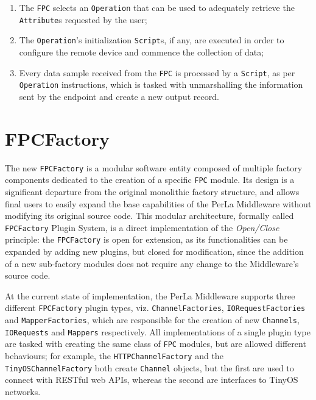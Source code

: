 \begin{enumerate}

    \item The \texttt{FPC} selects an \texttt{Operation} that can be used to
        adequately retrieve the \texttt{Attribute}s requested by the user;

    \item The \texttt{Operation}'s initialization \texttt{Script}s, if any, are
        executed in order to configure the remote device and commence the
        collection of data;

    \item Every data sample received from the \texttt{FPC} is processed by a
        \texttt{Script}, as per \texttt{Operation} instructions, which is
        tasked with unmarshalling the information sent by the endpoint and
        create a new output record.

\end{enumerate}

\section{FPCFactory}
\label{sec:newmiddleware.factory}

The new \texttt{FPCFactory} is a modular software entity composed of multiple
factory components dedicated to the creation of a specific \texttt{FPC} module.
Its design is a significant departure from the original monolithic factory
structure, and allows final users to easily expand the base capabilities of the
PerLa Middleware without modifying its original source code. This modular
architecture, formally called \texttt{FPCFactory} Plugin System, is a direct
implementation of the \textit{Open/Close} principle: the \texttt{FPCFactory} is
open for extension, as its functionalities can be expanded by adding new
plugins, but closed for modification, since the addition of a new sub-factory
modules does not require any change to the Middleware's source code.

At the current state of implementation, the PerLa Middleware supports three
different \texttt{FPCFactory} plugin types, viz. \texttt{ChannelFactories},
\texttt{IORequestFactories} and \texttt{MapperFactories}, which are responsible
for the creation of new \texttt{Channels}, \texttt{IORequests} and
\texttt{Mappers} respectively. All implementations of a single plugin type are
tasked with creating the same class of \texttt{FPC} modules, but are allowed
different behaviours; for example, the \texttt{HTTPChannelFactory} and the
\texttt{TinyOSChannelFactory} both create \texttt{Channel} objects, but the
first are used to connect with RESTful web APIs, whereas the second are
interfaces to TinyOS networks.

